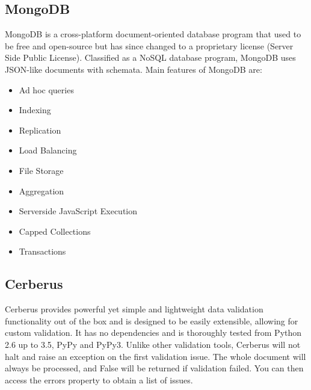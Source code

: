 \documentclass[a4paper,11pt]{article}
\begin{document}
\subsection{MongoDB}
MongoDB is a cross-platform document-oriented database program that used to be free and open-source but has since changed to a proprietary license \cite{mongo}(Server Side Public License). Classified as a NoSQL database program, MongoDB uses JSON-like documents with schemata. Main features of MongoDB are:
\begin{itemize}
    \item Ad hoc queries
    \item Indexing
    \item Replication
    \item Load Balancing
    \item File Storage
    \item Aggregation
    \item Serverside JavaScript Execution
    \item Capped Collections
    \item Transactions
\end{itemize}

\subsection{Cerberus}
Cerberus provides powerful yet simple and lightweight data validation functionality out of the box and is designed to be easily extensible, allowing for custom validation\cite{cerberus}. It has no dependencies and is thoroughly tested from Python 2.6 up to 3.5, PyPy and PyPy3. Unlike other validation tools, Cerberus will not halt and raise an exception on the first validation issue. The whole document will always be processed, and False will be returned if validation failed. You can then access the errors property to obtain a list of issues.
\end{document}
